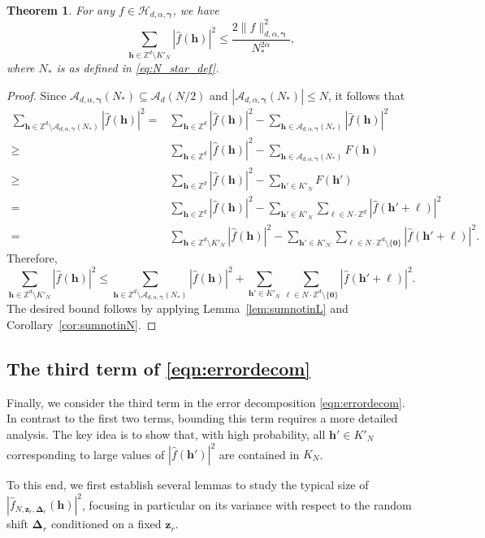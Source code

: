 \documentclass[a4paper,11pt]{article}
\newtheorem{theorem}{Theorem}[section]
\newcommand{\bszero}{\boldsymbol{0}}
\newcommand{\bsh}{\boldsymbol{h}}
\newcommand{\bsl}{\boldsymbol{\ell}}
\newcommand{\bsz}{\boldsymbol{z}}
\newcommand{\bsgamma}{\boldsymbol{\gamma}}
\newcommand{\bsDelta}{\boldsymbol{\Delta}}
\newcommand{\ZZ}{\mathbb{Z}}
\newcommand{\Acal}{\mathcal{A}}
\newcommand{\Hcal}{\mathcal{H}}
\begin{document}
\begin{theorem} \label{lem:fminusfK'}
For any $f\in \Hcal_{d,\alpha,\bsgamma}$, we have
\[
\sum_{\bsh\in \ZZ^d\setminus K'_N}  |\widehat{f}(\bsh)|^2\leq \frac{2\|f\|^2_{d,\alpha,\bsgamma}}{N^{2\alpha}_*},\]
where $N_*$ is as defined in \eqref{eq:N_star_def}.
\end{theorem}
\begin{proof}
Since $\Acal_{d,\alpha,\bsgamma}(N_*)\subseteq \mathcal{A}_d(N/2)$ and $|\Acal_{d,\alpha,\bsgamma}(N_*)| \leq N$, it follows that
\begin{align*}
    \sum_{\bsh \in \ZZ^d\setminus \Acal_{d,\alpha,\bsgamma}(N_*)}|\widehat{f}(\bsh)|^2
    =& \sum_{\bsh\in \ZZ^d} |\widehat{f}(\bsh)|^2 - \sum_{\bsh \in \Acal_{d,\alpha,\bsgamma}(N_*)}|\widehat{f}(\bsh)|^2 \\
    \geq & \sum_{\bsh\in \ZZ^d} |\widehat{f}(\bsh)|^2 - \sum_{\bsh \in \Acal_{d,\alpha,\bsgamma}(N_*)}F(\bsh)\\
    \geq & \sum_{\bsh\in \ZZ^d} |\widehat{f}(\bsh)|^2 - \sum_{\bsh' \in K'_N}F(\bsh')\\
    = & \sum_{\bsh\in \ZZ^d} |\widehat{f}(\bsh)|^2 -\sum_{\bsh'\in K'_N} \sum_{\bsl\in N\cdot \ZZ^d} |\widehat{f}(\bsh'+\bsl)|^2 \\
    = & \sum_{\bsh\in \ZZ^d\setminus K'_N} |\widehat{f}(\bsh)|^2-\sum_{\bsh'\in K'_N} \sum_{\bsl\in N\cdot \ZZ^d\setminus \{\bszero\}} |\widehat{f}(\bsh'+\bsl)|^2.
\end{align*}
Therefore,
\[
\sum_{\bsh\in \ZZ^d\setminus K'_N} |\widehat{f}(\bsh)|^2 \leq \sum_{\bsh \in \ZZ^d\setminus \Acal_{d,\alpha,\bsgamma}(N_*)}|\widehat{f}(\bsh)|^2+\sum_{\bsh'\in K'_N} \sum_{\bsl\in N\cdot \ZZ^d\setminus \{\bszero\}} |\widehat{f}(\bsh'+\bsl)|^2.
\]
The desired bound follows by applying Lemma~\ref{lem:sumnotinL} and Corollary~\ref{cor:sumnotinN}.
\end{proof}


\subsection{The third term of \eqref{eqn:errordecom}}

Finally, we consider the third term in the error decomposition \eqref{eqn:errordecom}.
In contrast to the first two terms, bounding this term requires a more detailed analysis.
The key idea is to show that, with high probability, all $\bsh' \in K'_N$ corresponding to large values of $|\widehat{f}(\bsh')|^2$ are contained in $K_N$.

To this end, we first establish several lemmas to study the typical size of $|\widehat{f}_{N,\bsz_r,\bsDelta_r}(\bsh)|^2$, 
focusing in particular on its variance with respect to the random shift $\bsDelta_r$ conditioned on a fixed $\bsz_r$.
\end{document}
